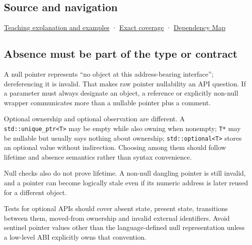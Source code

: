 \subsection{Source and navigation}\label{appendix-afae48c31800-source-and-navigation}

\hyperref[01-foundations-i-ch003-a-pointer-carries-an-access-contract]{Teaching explanation and examples} · \hyperref[appendix-fd090d982a15-m008---parts-113-126]{Exact coverage} · \hyperref[appendix-4ad47bdd269a]{Dependency Map}

\subsection{Absence must be part of the type or contract}\label{appendix-afae48c31800-absence-must-be-part-of-the-type-or-contract}

A null pointer represents ``no object at this address-bearing interface''; dereferencing it is invalid. That makes raw pointer nullability an API question. If a parameter must always designate an object, a reference or explicitly non-null wrapper communicates more than a nullable pointer plus a comment.

Optional ownership and optional observation are different. A \texttt{std::unique\_ptr\textless{}T\textgreater{}} may be empty while also owning when nonempty; \texttt{T*} may be nullable but usually says nothing about ownership; \texttt{std::optional\textless{}T\textgreater{}} stores an optional value without indirection. Choosing among them should follow lifetime and absence semantics rather than syntax convenience.

Null checks also do not prove lifetime. A non-null dangling pointer is still invalid, and a pointer can become logically stale even if its numeric address is later reused for a different object.

Tests for optional APIs should cover absent state, present state, transitions between them, moved-from ownership and invalid external identifiers. Avoid sentinel pointer values other than the language-defined null representation unless a low-level ABI explicitly owns that convention.
